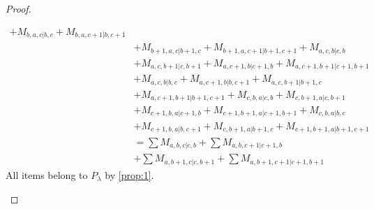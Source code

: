 \begin{proof}
\begin{enumerate}
\begin{enumerate}
\begin{equation}
\begin{aligned}
+ M_{b,a,c|b,c}
+ M_{b,a,c+1|b,c+1}\\
                                              &
+ M_{b+1,a,c|b+1,c}
+ M_{b+1,a,c+1|b+1,c+1}
+ M_{a,c,b|c,b}\\
                                              &
+ M_{a,c,b+1|c,b+1}
+ M_{a,c+1,b|c+1,b}
+ M_{a,c+1,b+1|c+1,b+1}\\
                                              &
+ M_{a,c,b|b,c}
+ M_{a,c+1,b|b,c+1}
+ M_{a,c,b+1|b+1,c}\\
                                              &
+ M_{a,c+1,b+1|b+1,c+1}
+ M_{c,b,a|c,b}
+ M_{c,b+1,a|c,b+1}\\
                                              &
+ M_{c+1,b,a|c+1,b}
+ M_{c+1,b+1,a|c+1,b+1}
+ M_{c,b,a|b,c}\\
                                              &
+ M_{c+1,b,a|b,c+1}
+ M_{c,b+1,a|b+1,c}
+ M_{c+1,b+1,a|b+1,c+1} \\
                                               &=
\sum M_{a,b,c|c,b}
+ \sum M_{a,b,c+1|c+1,b}\\
                                              &
+ \sum M_{a,b+1,c|c,b+1}
+ \sum M_{a,b+1,c+1|c+1,b+1}
          \end{aligned}
        \end{equation}
All items belong to $P_\lambda$ by \cref{prop:1}.


\end{enumerate}
\end{enumerate}
\end{proof}
